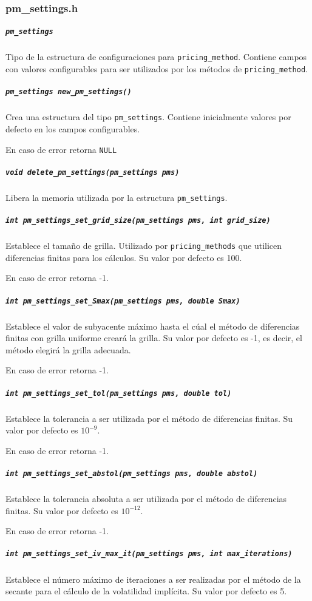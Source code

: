 \documentclass[12pt,a4paper,final]{article}
\begin{document}
		\subsubsection{pm\_settings.h}

			\subparagraph{\texttt{pm\_settings}}
				Tipo de la estructura de configuraciones para \texttt{pricing\_method}.
				Contiene campos con valores configurables para ser utilizados por los
				métodos de \texttt{pricing\_method}.

			\subparagraph{\texttt{pm\_settings new\_pm\_settings()}}
				Crea una estructura del tipo \texttt{pm\_settings}. Contiene inicialmente
				valores por defecto en los campos configurables.

				En caso de error retorna \texttt{NULL}

			\subparagraph{\texttt{void delete\_pm\_settings(pm\_settings pms)}}
				Libera la memoria utilizada por la estructura \texttt{pm\_settings}.

			\subparagraph{\texttt{int pm\_settings\_set\_grid\_size(pm\_settings pms, int grid\_size)}}
				Establece el tamaño de grilla. Utilizado por \texttt{pricing\_methods} que utilicen diferencias
				finitas para los cálculos. Su valor por defecto es 100.

				En caso de error retorna -1.

			\subparagraph{\texttt{int pm\_settings\_set\_Smax(pm\_settings pms, double Smax)}}
				Establece el valor de subyacente máximo hasta el cúal el método de diferencias finitas
				con grilla uniforme creará la grilla. Su valor por defecto es -1, es decir, el método
				elegirá la grilla adecuada.

				En caso de error retorna -1.

			\subparagraph{\texttt{int pm\_settings\_set\_tol(pm\_settings pms, double tol)}}
				Establece la tolerancia a ser utilizada por el método de diferencias finitas.
				Su valor por defecto es $10^{-9}$.

				En caso de error retorna -1.

			\subparagraph{\texttt{int pm\_settings\_set\_abstol(pm\_settings pms, double abstol)}}
				Establece la tolerancia absoluta a ser utilizada por el método de diferencias finitas.
				Su valor por defecto es $10^{-12}$.

				En caso de error retorna -1.

			\subparagraph{\texttt{int pm\_settings\_set\_iv\_max\_it(pm\_settings pms, int max\_iterations)}}
				Establece el número máximo de iteraciones a ser realizadas por el método de la secante
				para el cálculo de la volatilidad implícita. Su valor por defecto es 5.
\end{document}
